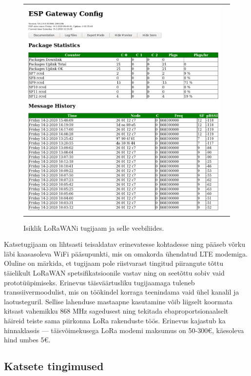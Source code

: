 \documentclass[12pt]{article}
\begin{document}
\begin{figure} [htbp]
\begin{tabular}{c c}
\begin{minipage}{0.53\textwidth}
                \includegraphics[width=\textwidth]{figures/ttn-jaama-liides.png}
            \end{minipage}
        \end{tabular}
        \caption{Isiklik LoRaWANi tugijaam ja selle veebiliides.}
        \label{fig:omatugijaam}
    \end{figure}

    Katsetugijaam on lihtsasti teisaldatav erinevatesse kohtadesse ning pääseb võrku läbi kaasasoleva WiFi pääsupunkti, mis on omakorda ühendatud LTE modemiga.
    Oluline on märkida, et tugijaam pole riistvarast tingitud piirangute tõttu täielikult LoRaWAN spetsifikatsioonile vastav ning on seetõttu sobiv vaid prototüüpimiseks.
    Erinevus täisväärtusliku tugijaamaga tuleneb transsiivermoodulist, mis on töökindel korraga teenindama vaid ühel kanalil ja laotusteguril.
    Sellise lahenduse mastaapne kasutamine võib liigselt koormata kitsast vahemikku 868 MHz sagedusest ning tekitada ebaproportsionaalselt häireid teiste sama piirkonna LoRa rakenduste töös.
    Erinevus kajastub ka hinnaklassis — täisvõimekusega LoRa modemi maksumus on 50-300€, käesoleva hind umbes 5€.

    \subsection{Katsete tingimused}
\end{document}
